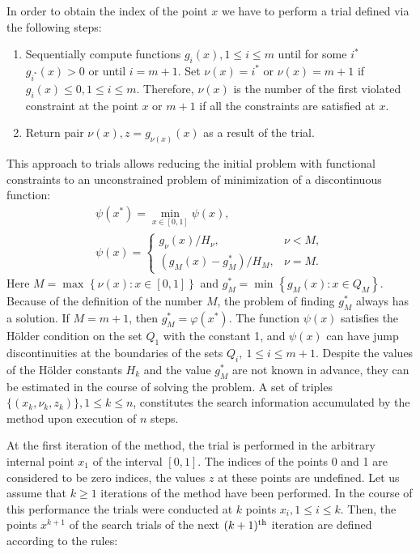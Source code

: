 \documentclass[runningheads]{llncs}
\begin{document}
In order to obtain the index of the point \(x\) we have to perform a trial defined via the following steps:
\begin{enumerate}
  \item Sequentially  compute functions \(g_i(x),1 \leqslant i \leqslant m\) until for some \(i^*\) \(g_{i^*}(x)>0\) or until \(i=m+1\).
  Set \(\nu(x)=i^*\) or \(\nu(x)=m+1\) if \(g_i(x) \leqslant 0, 1 \leqslant i \leqslant m\).
  Therefore, \(\nu(x)\) is the number of the first violated constraint at the point \(x\) or \(m+1\) if
  all the constraints are satisfied at \(x\).
  \item Return pair \(\nu(x), z=g_{\nu(x)}(x)\) as a result of the trial.
\end{enumerate}

This approach to trials allows reducing the initial problem with functional
constraints to an unconstrained problem of minimization of a discontinuous function:
\begin{displaymath}
  \begin{array}{lr}
    \psi (x^{*})=\min_{x\in [0,1]}\psi (x), \\
    \psi (x)={\begin{cases}g_{\nu }(x)/H_{\nu },&\nu <M,\\(g_{M}(x)-g_{M}^{*})/H_{M},&\nu
=M.\end{cases}}
  \end{array}
\end{displaymath}
Here \(M=\max_{}^{}\left\{\nu (x):x\in [0,1]\right\}\) and \(g_{M}^{*}=\min
_{}^{}\left\{g_{M}(x):x\in Q_{M}\right\}\).
Because of the definition of the number \(M\), the problem of finding \(g_{M}^{*}\) always
has a solution. If \(M=m+1\), then \(g_{M}^{*}=\varphi(x^{*})\).
The function \(\psi (x)\) satisfies the H\"{o}lder condition on the set
\(Q_1\) with the constant 1, and \(\psi (x)\) can have jump discontinuities at the boundaries
of the sets \(Q_i,\:1\leqslant i \leqslant m+1\).
Despite the values of the H\"{o}lder constants \(H_k\) and the value \(g_{M}^{*}\) are not
known in advance, they can be estimated in the course of solving the problem.
A set of triples \(\{(x_k,\nu_k,z_k)\}, 1\leqslant k\leqslant n\), constitutes the search information
accumulated by the method upon execution of \(n\) steps.

At the first iteration of the method, the trial is performed in the arbitrary internal point \(x_1\) of
the interval \([0,1]\).
The indices of the points 0 and 1 are considered to be zero indices, the values \(z\) at these points
are undefined.
Let us assume that \(k\geqslant 1\) iterations of the method have been performed. In the course of this performance the
trials were conducted at \(k\) points \(x_i, 1\leqslant i\leqslant k\).
Then, the points \(x^{k+1}\) of the search trials of the next \((k+1)^{\rm th}\) iteration are
defined according to the rules:
\end{document}
